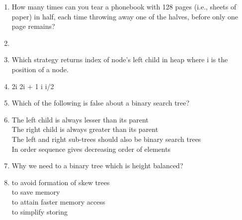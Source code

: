 \documentclass[12pt ,a4paper]{exam}
\begin{document}
	\begin{enumerate}[start=1,label={\bfseries Q\arabic*)}]
		\itemsep0.2em
		 \item How many times can you tear a phonebook with 128 pages (i.e., sheets of paper) in half, each time throwing away one of the halves, before only one page remains?
		\item[] 
		\begin{oneparchoices}
			 \checkmark
		\end{oneparchoices}
	
		\item Which strategy returns index of node’s left child in heap where i is the position of a node.
		\item[] 
		\begin{oneparchoices}
			\choice 2i \checkmark  %
			\choice 2i + 1 
			\choice i
			\choice i/2
		\end{oneparchoices}
		
	   	\item Which of the following is false about a binary search tree?
	   \item[] 
	   \begin{oneparchoices}
		   	\choice The left child is always lesser than its parent\\  %
		   	\choice The right child is always greater than its parent \\
		   	\choice The left and right sub-trees should also be binary search trees\\
		   	\choice In order sequence gives decreasing order of elements \checkmark 
	   \end{oneparchoices}
	
		\item  Why we need to a binary tree which is height balanced?
		\item[] 
		\begin{oneparchoices}
			\choice to avoid formation of skew trees \checkmark  \\ %
			\choice to save memory \\
			\choice to attain faster memory access\\
			\choice to simplify storing
		\end{oneparchoices}
	

\end{enumerate}
\end{document}
